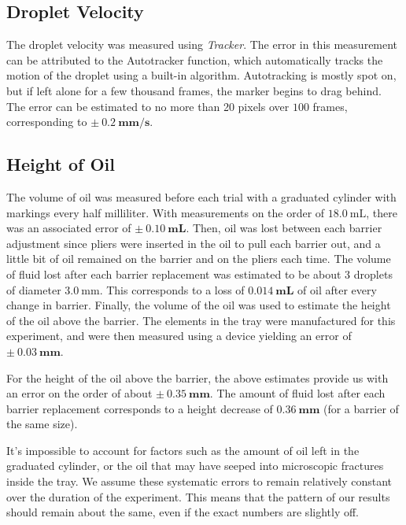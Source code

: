     \subsection{Droplet Velocity}
The droplet velocity was measured using \textit{Tracker}. The error in this measurement can be attributed to the Autotracker function, which automatically tracks the motion of the droplet using a built-in algorithm. Autotracking is mostly spot on, but if left alone for a few thousand frames, the marker begins to drag behind. The error can be estimated to no more than 20 pixels over $100$ frames, corresponding to $\mathbf{\pm~0.2~\mathrm{\textbf{mm/s}}}$.

    \subsection{Height of Oil}
The volume of oil was measured before each trial with a graduated cylinder with markings every half milliliter. With measurements on the order of $18.0~\mathrm{mL}$, there was an associated error of $\mathbf{\pm~0.10~\mathrm{\textbf{mL}}}$. Then, oil was lost between each barrier adjustment since pliers were inserted in the oil to pull each barrier out, and a little bit of oil remained on the barrier and on the pliers each time. The volume of fluid lost after each barrier replacement was estimated to be about 3 droplets of diameter $3.0~\mathrm{mm}$. This corresponds to a loss of $\mathbf{0.014~\mathrm{\textbf{mL}}}$ of oil after every change in barrier. 
Finally, the volume of the oil was used to estimate the height of the oil above the barrier. The elements in the tray were manufactured for this experiment, and were then measured using a device yielding an error of $\mathbf{\pm~0.03~\mathrm{\textbf{mm}}}$. 

For the height of the oil above the barrier, the above estimates provide us with an error on the order of about $\mathbf{\pm~0.35~\mathrm{\textbf{mm}}}$. The amount of fluid lost after each barrier replacement corresponds to a height decrease of $\mathbf{0.36~\mathrm{\textbf{mm}}}$ (for a barrier of the same size).

It's impossible to account for factors such as the amount of oil left in the graduated cylinder, or the oil that may have seeped into microscopic fractures inside the tray. We assume these systematic errors to remain relatively constant over the duration of the experiment. This means that the pattern of our results should remain about the same, even if the exact numbers are slightly off. 

